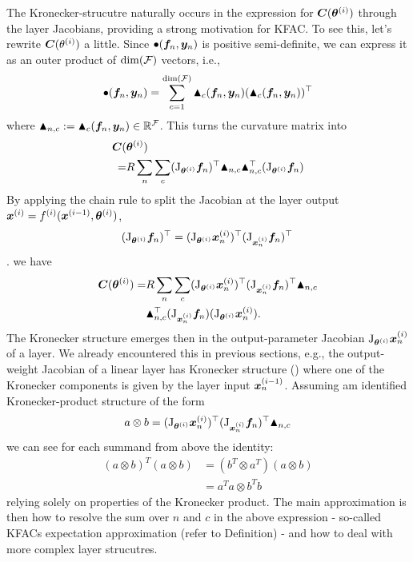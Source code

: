 The Kronecker-strucutre naturally occurs in the expression for ${\bm{C}}({\bm{\theta}}^{(i)})$ through the layer Jacobians, providing a strong motivation for KFAC. To see this, let's rewrite ${\bm{C}}(\theta^{(i)})$ a little. Since $\bullet({\bm{f}}_n, {\bm{y}}_n)$ is positive semi-definite, we can express it as an outer product of $\dim({\mathcal{F}})$ vectors, i.e., $$\bullet({\bm{f}}_n, {\bm{y}}_n) = \sum_{c=1}^{\dim({\mathcal{F}})} \blacktriangle_c({\bm{f}}_n, {\bm{y}}_n) (\blacktriangle_c({\bm{f}}_n, {\bm{y}}_n))^{\top}$$ where $\blacktriangle_{n,c} := \blacktriangle_c({\bm{f}}_n, {\bm{y}}_n) \in {\mathbb{R}}^{{\mathcal{F}}}$. This turns the curvature matrix into
\begin{align*}
  {\bm{C}}(&{\bm{\theta}}^{(i)}) \\
  =& 
  R \sum_n \sum_{c}
  (\mathrm{J}_{{\bm{\theta}}^{(i)}} {\bm{f}}_n)^{\top}
  \blacktriangle_{n,c} \blacktriangle_{n,c}^{\top}
  (\mathrm{J}_{{\bm{\theta}}^{(i)}} {\bm{f}}_n)
\end{align*}
By applying the chain rule to split the Jacobian at the layer output ${\bm{x}}^{(i)} = f^{(i)}({\bm{x}}^{(i-1)}, {\bm{\theta}}^{(i)})$,
\begin{align*}
  (\mathrm{J}_{{\bm{\theta}}^{(i)}} {\bm{f}}_n)^{\top}
  =
  (\mathrm{J}_{{\bm{\theta}}^{(i)}} {\bm{x}}^{(i)}_n)^{\top}
  (\mathrm{J}_{{\bm{x}}_n^{(i)}} {\bm{f}}_n)^{\top}\,
\end{align*}.
we have
\begin{align*}
  {\bm{C}}({\bm{\theta}}^{(i)}) =& R \sum_n \sum_{c}
  (\mathrm{J}_{{\bm{\theta}}^{(i)}} {\bm{x}}^{(i)}_n)^{\top}
  (\mathrm{J}_{{\bm{x}}_n^{(i)}} {\bm{f}}_n)^{\top}
  \blacktriangle_{n,c} \\
  &\blacktriangle_{n,c}^{\top}
  (\mathrm{J}_{{\bm{x}}_n^{(i)}} {\bm{f}}_n)
  (\mathrm{J}_{{\bm{\theta}}^{(i)}} {\bm{x}}^{(i)}_n).
\end{align*}
The Kronecker structure emerges then in the output-parameter Jacobian $\mathrm{J}_{{\bm{\theta}}^{(i)}} {\bm{x}}_n^{(i)}$ of a layer. We already encountered this in previous sections, e.g., the output-weight Jacobian of a linear layer has Kronecker structure () where one of the Kronecker components is given by the layer input ${\bm{x}}^{(i-1)}_n$. Assuming am identified Kronecker-product structure of the form
$$ a \otimes b = (\mathrm{J}_{{\bm{\theta}}^{(i)}} {\bm{x}}^{(i)}_n)^{\top}
(\mathrm{J}_{{\bm{x}}_n^{(i)}} {\bm{f}}_n)^{\top}
\blacktriangle_{n,c} $$ 
we can see for each summand from above the identity:
\begin{align*}
(a \otimes b)^T (a \otimes b) &= (b^T \otimes a^T)(a \otimes b) \\
&= a^Ta \otimes b^Tb
\end{align*}
relying solely on properties of the Kronecker product. The main approximation is then how to resolve the sum over $n$ and $c$ in the above expression - so-called KFACs expectation approximation (refer to Definition) - and how to deal with more complex layer strucutres. 

